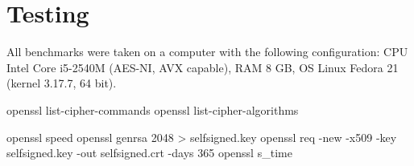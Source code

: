 \section{Testing}

All benchmarks were taken on a computer with the following configuration: CPU Intel Core i5-2540M (AES-NI, AVX capable), RAM 8 GB, OS Linux Fedora 21 (kernel 3.17.7, 64 bit).

openssl list-cipher-commands
openssl list-cipher-algorithms

openssl speed
openssl genrsa 2048 > selfsigned.key
openssl req -new -x509 -key selfsigned.key -out selfsigned.crt -days 365
openssl s\_time
